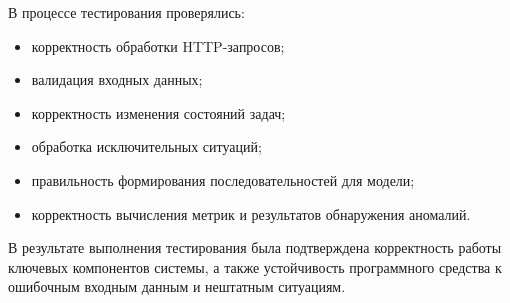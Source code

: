 В процессе тестирования проверялись:

\begin{itemize}
    \item корректность обработки HTTP-запросов;
    \item валидация входных данных;
    \item корректность изменения состояний задач;
    \item обработка исключительных ситуаций;
    \item правильность формирования последовательностей для модели;
    \item корректность вычисления метрик и результатов обнаружения аномалий.
\end{itemize}

В результате выполнения тестирования была подтверждена корректность работы ключевых компонентов системы, а также устойчивость программного средства к ошибочным входным данным и нештатным ситуациям.